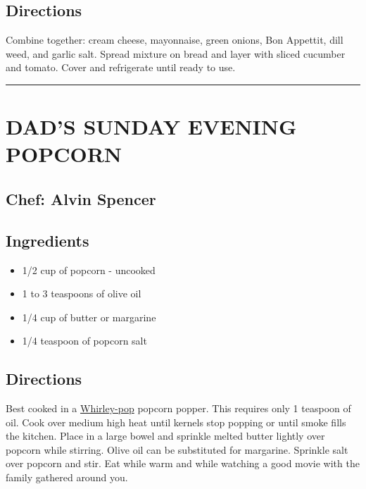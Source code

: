 \documentclass[
]{book}
\providecommand{\tightlist}{%
  \setlength{\itemsep}{0pt}\setlength{\parskip}{0pt}}
\begin{document}
\hypertarget{directions-3}{%
\subsection*{Directions}\label{directions-3}}


Combine together: cream cheese, mayonnaise, green onions, Bon Appettit, dill weed, and garlic salt. Spread mixture on bread and layer with sliced cucumber and tomato. Cover and refrigerate until ready to use.

\begin{center}\rule{0.5\linewidth}{0.5pt}\end{center}

\hypertarget{dads-sunday-evening-popcorn}{%
\section*{DAD'S SUNDAY EVENING POPCORN}\label{dads-sunday-evening-popcorn}}


\hypertarget{chef-alvin-spencer}{%
\subsection*{Chef: Alvin Spencer}\label{chef-alvin-spencer}}


\hypertarget{ingredients-4}{%
\subsection*{Ingredients}\label{ingredients-4}}


\begin{itemize}
\tightlist
\item
  1/2 cup of popcorn - uncooked
\item
  1 to 3 teaspoons of olive oil
\item
  1/4 cup of butter or margarine
\item
  1/4 teaspoon of popcorn salt
\end{itemize}

\hypertarget{directions-4}{%
\subsection*{Directions}\label{directions-4}}


Best cooked in a \href{https://www.whirleypopshop.com/}{Whirley-pop} popcorn popper. This requires only 1 teaspoon of oil. Cook over medium high heat until kernels stop popping or until smoke fills the kitchen. Place in a large bowel and sprinkle melted butter lightly over popcorn while stirring. Olive oil can be substituted for margarine. Sprinkle salt over popcorn and stir. Eat while warm and while watching a good movie with the family gathered around you.
\end{document}
